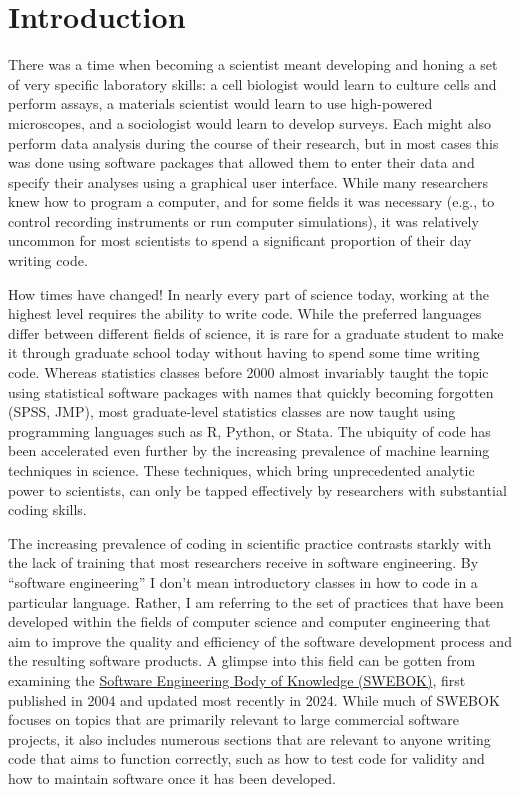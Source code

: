 \chapter{Introduction}

There was a time when becoming a scientist meant developing and honing a set of very specific laboratory skills: a cell biologist would learn to culture cells and perform assays, a materials scientist would learn to use high-powered microscopes, and a sociologist would learn to develop surveys.
Each might also perform data analysis during the course of their research, but in most cases this was done using software packages that allowed them to enter their data and specify their analyses using a graphical user interface.
While many researchers knew how to program a computer, and for some fields it was necessary (e.g., to control recording instruments or run computer simulations), it was relatively uncommon for most scientists to spend a significant proportion of their day writing code.

How times have changed! In nearly every part of science today, working at the highest level requires the ability to write code.
While the preferred languages differ between different fields of science, it is rare for a graduate student to make it through graduate school today without having to spend some time writing code.
Whereas statistics classes before 2000 almost invariably taught the topic using statistical software packages with names that quickly becoming forgotten (SPSS, JMP), most graduate-level statistics classes are now taught using programming languages such as R, Python, or Stata.
The ubiquity of code has been accelerated even further by the increasing prevalence of machine learning techniques in science.
These techniques, which bring unprecedented analytic power to scientists, can only be tapped effectively by researchers with substantial coding skills.

The increasing prevalence of coding in scientific practice contrasts starkly with the lack of training that most researchers receive in software engineering.
By ``software engineering'' I don't mean introductory classes in how to code in a particular language.
Rather, I am referring to the set of practices that have been developed within the fields of computer science and computer engineering that aim to improve the quality and efficiency of the software development process and the resulting software products.
A glimpse into this field can be gotten from examining the \href{https://www.computer.org/education/bodies-of-knowledge/software-engineering}{Software Engineering Body of Knowledge (SWEBOK)}, first published in 2004 and updated most recently in 2024.
While much of SWEBOK focuses on topics that are primarily relevant to large commercial software projects, it also includes numerous sections that are relevant to anyone writing code that aims to function correctly, such as how to test code for validity and how to maintain software once it has been developed.

